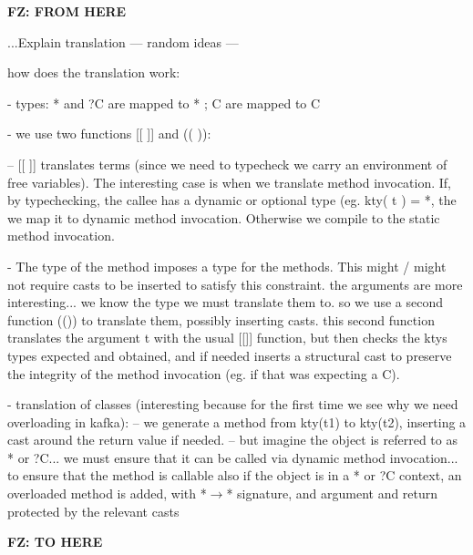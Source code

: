 \documentclass[acmlarge, anonymous, authordraft]{acmart}
\newcommand{\FZ}[1]{\textbf{FZ: #1}}
\begin{document}
\FZ{FROM HERE}

...Explain translation  --- random ideas ---


how does the translation work:

- types: * and ?C are mapped to * ; C are mapped to C

- we use two functions [[ ]] and (( )):

  -- [[ ]] translates terms (since we need to typecheck we carry an environment of free variables).  The interesting case is when we translate method invocation.  If, by typechecking, the callee has a dynamic or optional type (eg. kty( t ) = *, the we map it to dynamic method invocation.  Otherwise we compile to the static method invocation. 

- The type of the method imposes a type for the methods.  This might / might not require casts to be inserted to satisfy this constraint.   the arguments are more interesting...  we know the type we must translate them to.  so we use a second function (()) to translate them, possibly inserting casts.  this second function translates the argument t with the usual [[]] function, but then checks the ktys types expected and obtained, and if needed inserts a structural cast to preserve the integrity of the method invocation (eg. if that was expecting a C).

- translation of classes (interesting because for the first time we see why we need overloading in kafka): 
  -- we generate a method from kty(t1) to kty(t2), inserting a cast around the return value if needed. 
  --  but imagine the object is referred to as * or ?C...  we must ensure that it can be called via dynamic method invocation...   to ensure that the method is callable also if the object is in a * or ?C context,  an overloaded method is added, with *\(\to\)* signature, and argument and return protected by the relevant casts
  
 
\FZ{TO HERE}
\end{document}
